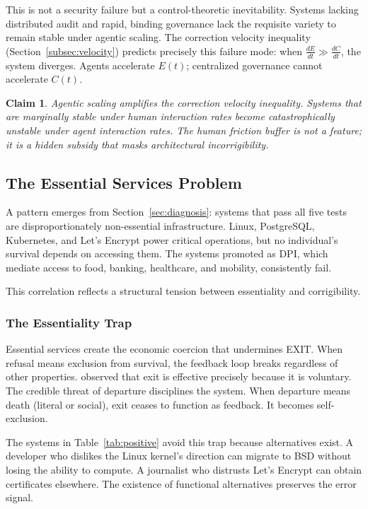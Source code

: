\documentclass{article}
\newtheorem{claim}{Claim}
\begin{document}
This is not a security failure but a control-theoretic inevitability. Systems lacking distributed audit and rapid, binding governance lack the requisite variety to remain stable under agentic scaling. The correction velocity inequality (Section~\ref{subsec:velocity}) predicts precisely this failure mode: when $\frac{dE}{dt} \gg \frac{dC}{dt}$, the system diverges. Agents accelerate $E(t)$; centralized governance cannot accelerate $C(t)$.

\begin{claim}
Agentic scaling amplifies the correction velocity inequality. Systems that are marginally stable under human interaction rates become catastrophically unstable under agent interaction rates. The human friction buffer is not a feature; it is a hidden subsidy that masks architectural incorrigibility.
\end{claim}

\subsection{The Essential Services Problem}
\label{subsec:essential}

A pattern emerges from Section~\ref{sec:diagnosis}: systems that pass all five tests are disproportionately non-essential infrastructure. Linux, PostgreSQL, Kubernetes, and Let's Encrypt power critical operations, but no individual's survival depends on accessing them. The systems promoted as DPI, which mediate access to food, banking, healthcare, and mobility, consistently fail.

This correlation reflects a structural tension between essentiality and corrigibility.

\subsubsection{The Essentiality Trap}

Essential services create the economic coercion that undermines EXIT. When refusal means exclusion from survival, the feedback loop breaks regardless of other properties. \citet{hirschman1970} observed that exit is effective precisely because it is voluntary. The credible threat of departure disciplines the system. When departure means death (literal or social), exit ceases to function as feedback. It becomes self-exclusion.

The systems in Table~\ref{tab:positive} avoid this trap because alternatives exist. A developer who dislikes the Linux kernel's direction can migrate to BSD without losing the ability to compute. A journalist who distrusts Let's Encrypt can obtain certificates elsewhere. The existence of functional alternatives preserves the error signal.
\end{document}
